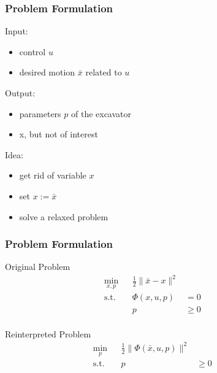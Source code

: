 \documentclass{beamer}
\begin{document}
\begin{frame}
    \frametitle{Problem Formulation}
    Input:
    \begin{itemize}
        \item{control $u$}
        \item{desired motion $\bar{x}$ related to $u$}
    \end{itemize}

    Output:
    \begin{itemize}
        \item{parameters $p$ of the excavator}
        \item{x, but not of interest}
    \end{itemize}

    Idea:
    \begin{itemize}
        \item{get rid of variable $x$}
        \item{set $x := \bar{x}$}
        \item{solve a relaxed problem}
    \end{itemize}
\end{frame}

\begin{frame}
    \frametitle{Problem Formulation}

    Original Problem
    \begin{align*}
        \min_{x,p} & & \frac{1}{2} \| \bar{x} - x \|^2 & & \\
        \operatorname{s.t.} & & \Phi(x,u,p) & = 0 & & \\
                            & & p & \geq 0 & & \\
    \end{align*}

    Reinterpreted Problem
    \begin{align*}
        \min_{p}  & & \frac{1}{2} \| \Phi(\bar{x},u,p) \|^2 & & \\
        \operatorname{s.t.} & & p & \geq 0 & & \\
    \end{align*}
\end{frame}
\end{document}
